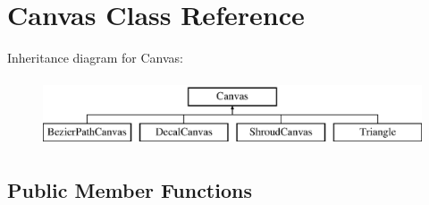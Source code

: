 \hypertarget{class_canvas}{\section{Canvas Class Reference}
\label{class_canvas}
}
Inheritance diagram for Canvas\-:\begin{figure}[H]
\begin{center}
\leavevmode
\includegraphics[height=2.000000cm]{class_canvas}
\end{center}
\end{figure}
\subsection*{Public Member Functions}
